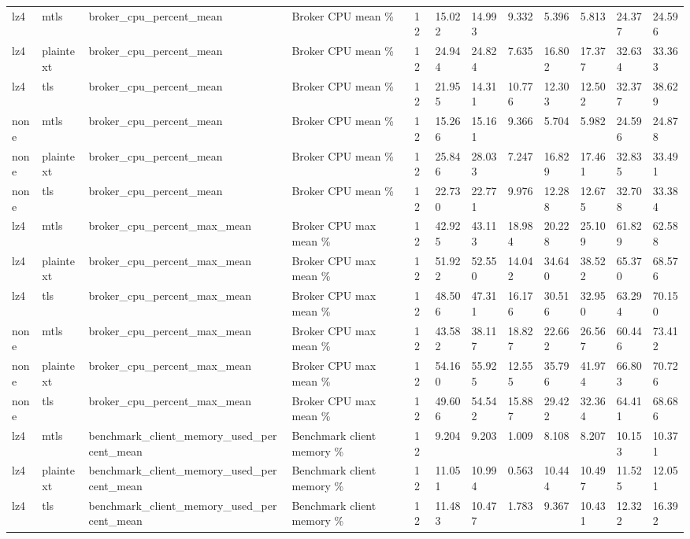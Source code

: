 \begin{longtable}{llllllllllll}
lz4 & mtls & broker\_cpu\_percent\_mean & Broker CPU mean \% & 12 & 15.022 & 14.993 & 9.332 & 5.396 & 5.813 & 24.377 & 24.596 \\
lz4 & plaintext & broker\_cpu\_percent\_mean & Broker CPU mean \% & 12 & 24.944 & 24.824 & 7.635 & 16.802 & 17.377 & 32.634 & 33.363 \\
lz4 & tls & broker\_cpu\_percent\_mean & Broker CPU mean \% & 12 & 21.955 & 14.311 & 10.776 & 12.303 & 12.502 & 32.377 & 38.629 \\
none & mtls & broker\_cpu\_percent\_mean & Broker CPU mean \% & 12 & 15.266 & 15.161 & 9.366 & 5.704 & 5.982 & 24.596 & 24.878 \\
none & plaintext & broker\_cpu\_percent\_mean & Broker CPU mean \% & 12 & 25.846 & 28.033 & 7.247 & 16.829 & 17.461 & 32.835 & 33.491 \\
none & tls & broker\_cpu\_percent\_mean & Broker CPU mean \% & 12 & 22.730 & 22.771 & 9.976 & 12.288 & 12.675 & 32.708 & 33.384 \\
lz4 & mtls & broker\_cpu\_percent\_max\_mean & Broker CPU max mean \% & 12 & 42.925 & 43.113 & 18.984 & 20.228 & 25.109 & 61.829 & 62.588 \\
lz4 & plaintext & broker\_cpu\_percent\_max\_mean & Broker CPU max mean \% & 12 & 51.922 & 52.550 & 14.042 & 34.640 & 38.522 & 65.370 & 68.576 \\
lz4 & tls & broker\_cpu\_percent\_max\_mean & Broker CPU max mean \% & 12 & 48.506 & 47.311 & 16.176 & 30.516 & 32.950 & 63.294 & 70.150 \\
none & mtls & broker\_cpu\_percent\_max\_mean & Broker CPU max mean \% & 12 & 43.582 & 38.117 & 18.827 & 22.662 & 26.567 & 60.446 & 73.412 \\
none & plaintext & broker\_cpu\_percent\_max\_mean & Broker CPU max mean \% & 12 & 54.160 & 55.925 & 12.555 & 35.796 & 41.974 & 66.803 & 70.726 \\
none & tls & broker\_cpu\_percent\_max\_mean & Broker CPU max mean \% & 12 & 49.606 & 54.542 & 15.887 & 29.422 & 32.364 & 64.411 & 68.686 \\
lz4 & mtls & benchmark\_client\_memory\_used\_percent\_mean & Benchmark client memory \% & 12 & 9.204 & 9.203 & 1.009 & 8.108 & 8.207 & 10.153 & 10.371 \\
lz4 & plaintext & benchmark\_client\_memory\_used\_percent\_mean & Benchmark client memory \% & 12 & 11.051 & 10.994 & 0.563 & 10.444 & 10.497 & 11.525 & 12.051 \\
lz4 & tls & benchmark\_client\_memory\_used\_percent\_mean & Benchmark client memory \% & 12 & 11.483 & 10.477 & 1.783 & 9.367 & 10.431 & 12.322 & 16.392 \\

\end{longtable}
